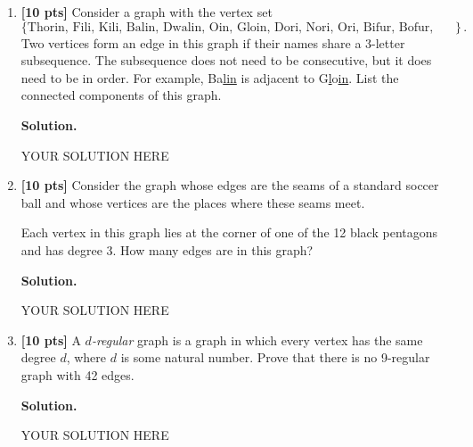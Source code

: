 \documentclass[11pt]{article}
\newcommand{\sol}{\bigskip\textbf{Solution.}\qquad\qquad}
\newcommand{\points}[1]{\textbf{[#1 pts]}}
\begin{document}
\begin{enumerate}
\begin{center}
		\end{center}
		
\sol

YOUR SOLUTION HERE

\bigskip

\bigskip




\item \points{10} 
Consider a graph with the vertex set
\[\{\text{Thorin, Fili, Kili, Balin, Dwalin, Oin, Gloin, Dori, Nori, Ori, Bifur, Bofur, Bombur}\}\,.\]
Two vertices form an edge in this graph if their names share a 3-letter subsequence. The subsequence does not need to be consecutive, but it does need to be in order. For example, Ba\underline{lin} is adjacent to G\underline{l}o\underline{in}. List the connected components of this graph.

\sol

YOUR SOLUTION HERE

\bigskip

\bigskip




\item \points{10} 
Consider the graph whose edges are the seams of a standard soccer ball and whose vertices are the places where these seams meet.

Each vertex in this graph lies at the corner of one of the 12 black pentagons and has degree 3. How many edges are in this graph?

\sol

YOUR SOLUTION HERE

\bigskip

\bigskip



\item \points{10} 
A \emph{$d$-regular} graph is a graph in which every vertex has the same degree $d$, where $d$ is some natural number. Prove that there is no 9-regular graph with 42 edges.

\sol

YOUR SOLUTION HERE

\bigskip

\bigskip




\end{enumerate}
\end{document}
